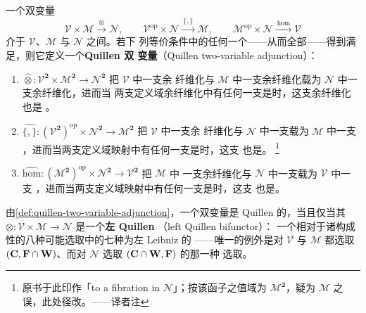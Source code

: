 \begin{definition}\label{def:quillen-two-variable-adjunction}
一个双变量\trAdjunction
\[ \mathcal{V}\times\mathcal{M}\xrightarrow{\ \otimes\ }\mathcal{N},\qquad
   \mathcal{V}^{\mathrm{op}}\times\mathcal{N}\xrightarrow{\ \{,\}\ }\mathcal{M},
   \qquad
   \mathcal{M}^{\mathrm{op}}\times\mathcal{N}\xrightarrow{\ \mathrm{hom}\ }\mathcal{V} \]
介于\trModelCategory{} $\mathcal{V}$、$\mathcal{M}$ 与 $\mathcal{N}$ 之间。若下
列等价条件中的任何一个——从而全部——得到满足，则它定义一个\textbf{Quillen 双
变量\trAdjunction}（Quillen two-variable adjunction）：
\begin{enumerate}[label=(\roman*)]
\item \trFunctor{} $\widehat{\otimes}\colon\mathcal{V}^{\mathbf{2}}\times\mathcal{M}^{\mathbf{2}}\to\mathcal{N}^{\mathbf{2}}$ 把 $\mathcal{V}$ 中一支余
  纤维化与 $\mathcal{M}$ 中一支余纤维化载为 $\mathcal{N}$ 中一支余纤维化，进而当
  两支定义域余纤维化中有任何一支是\trWeakEquivalence{}时，这支余纤维化也是%
\trWeakEquivalence。
\item \trFunctor{} $\widehat{\{,\}}\colon(\mathcal{V}^{\mathbf{2}})^{\mathrm{op}}\times\mathcal{N}^{\mathbf{2}}\to\mathcal{M}^{\mathbf{2}}$ 把 $\mathcal{V}$ 中一支余
  纤维化与 $\mathcal{N}$ 中一支\trFibration{}载为 $\mathcal{M}$ 中一支%
\trFibration，进而当两支定义域映射中有任何一支是\trWeakEquivalence{}时，这支%
\trFibration{}也是\trWeakEquivalence。%
  \footnote{原书于此印作「to a fibration in $\mathcal{N}$」；按该函子之值域为
  $\mathcal{M}^{\mathbf{2}}$，疑为 $\mathcal{M}$ 之误，此处径改。——译者注}
\item \trFunctor{} $\widehat{\mathrm{hom}}\colon(\mathcal{M}^{\mathbf{2}})^{\mathrm{op}}\times\mathcal{N}^{\mathbf{2}}\to\mathcal{V}^{\mathbf{2}}$ 把 $\mathcal{M}$ 中
  一支余纤维化与 $\mathcal{N}$ 中一支\trFibration{}载为 $\mathcal{V}$ 中一支%
\trFibration，进而当两支定义域映射中有任何一支是\trWeakEquivalence{}时，这支%
\trFibration{}也是\trWeakEquivalence。
\end{enumerate}
\end{definition}

\begin{remark}\label{rem:left-quillen-bifunctor}
由\cref{def:quillen-two-variable-adjunction}，一个双变量\trAdjunction{}是 Quillen
的，当且仅当其\trLeftAdjoint{} $\otimes\colon\mathcal{V}\times\mathcal{M}\to\mathcal{N}$
是一个\textbf{左 Quillen \trBifunctor}（left Quillen bifunctor）：
一个相对于诸构成性\trWeakFactorizationSystem{}的八种可能选取中的七种为左 Leibniz 的%
\trBifunctor——唯一的例外是对 $\mathcal{V}$ 与 $\mathcal{M}$ 都选取
$(\mathbf{C},\mathbf{F}\cap\mathbf{W})$、而对 $\mathcal{N}$ 选取 $(\mathbf{C}\cap\mathbf{W},\mathbf{F})$ 的那一种
选取。
\end{remark}

